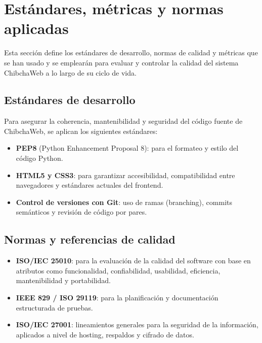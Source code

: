 \documentclass[12pt,a4paper]{article}
\begin{document}
\section{Estándares, métricas y normas aplicadas}

Esta sección define los estándares de desarrollo, normas de calidad y métricas que se han
usado y se emplearán para evaluar y controlar la calidad del sistema ChibchaWeb a lo largo
de su ciclo de vida.

\subsection{Estándares de desarrollo}

Para asegurar la coherencia, mantenibilidad y seguridad del código fuente de ChibchaWeb, se
aplican los siguientes estándares:

\begin{itemize}
  \item \textbf{PEP8} (Python Enhancement Proposal 8): para el formateo y estilo del código Python.
  \item \textbf{HTML5 y CSS3}: para garantizar accesibilidad, compatibilidad entre navegadores y
        estándares actuales del frontend.
  \item \textbf{Control de versiones con Git}: uso de ramas (branching), commits semánticos y
        revisión de código por pares.
\end{itemize}

\subsection{Normas y referencias de calidad}

\begin{itemize}
  \item \textbf{ISO/IEC 25010}: para la evaluación de la calidad del software con base en atributos
        como funcionalidad, confiabilidad, usabilidad, eficiencia, mantenibilidad y
        portabilidad.
  \item \textbf{IEEE 829 / ISO 29119}: para la planificación y documentación estructurada de
        pruebas.
  \item \textbf{ISO/IEC 27001}: lineamientos generales para la seguridad de la información,
        aplicados a nivel de hosting, respaldos y cifrado de datos.
\end{itemize}
\end{document}
